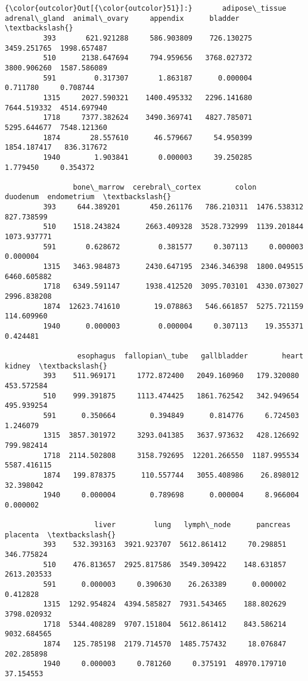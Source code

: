 \documentclass[11pt]{article}
\begin{document}
\begin{Verbatim}[commandchars=\\\{\}]
{\color{outcolor}Out[{\color{outcolor}51}]:}       adipose\_tissue  adrenal\_gland  animal\_ovary     appendix      bladder  \textbackslash{}
         393       621.921288     586.903809    726.130275  3459.251765  1998.657487   
         510      2138.647694     794.959656   3768.027372  3800.906260  1587.586089   
         591         0.317307       1.863187      0.000004     0.711780     0.708744   
         1315     2027.590321    1400.495332   2296.141680  7644.519332  4514.697940   
         1718     7377.382624    3490.369741   4827.785071  5295.644677  7548.121360   
         1874       28.557610      46.579667     54.950399  1854.187417   836.317672   
         1940        1.903841       0.000003     39.250285     1.779450     0.354372   
         
                bone\_marrow  cerebral\_cortex        colon     duodenum  endometrium  \textbackslash{}
         393     644.389201       450.261176   786.210311  1476.538312   827.738599   
         510    1518.243824      2663.409328  3528.732999  1139.201844  1073.937771   
         591       0.628672         0.381577     0.307113     0.000003     0.000004   
         1315   3463.984873      2430.647195  2346.346398  1800.049515  6460.605882   
         1718   6349.591147      1938.412520  3095.703101  4330.073027  2996.838208   
         1874  12623.741610        19.078863   546.661857  5275.721159   114.609960   
         1940      0.000003         0.000004     0.307113    19.355371     0.424481   
         
                 esophagus  fallopian\_tube   gallbladder        heart       kidney  \textbackslash{}
         393    511.969171     1772.872400   2049.160960   179.320080   453.572584   
         510    999.391875     1113.474425   1861.762542   342.949654   495.939254   
         591      0.350664        0.394849      0.814776     6.724503     1.246079   
         1315  3857.301972     3293.041385   3637.973632   428.126692   799.982414   
         1718  2114.502808     3158.792695  12201.266550  1187.995534  5587.416115   
         1874   199.878375      110.557744   3055.408986    26.898012    32.398042   
         1940     0.000004        0.789698      0.000004     8.966004     0.000002   
         
                     liver         lung   lymph\_node      pancreas     placenta  \textbackslash{}
         393    532.393163  3921.923707  5612.861412     70.298851   346.775824   
         510    476.813657  2925.817586  3549.309422    148.631857  2613.203533   
         591      0.000003     0.390630    26.263389      0.000002     0.412828   
         1315  1292.954824  4394.585827  7931.543465    188.802629  3798.020932   
         1718  5344.408289  9707.151804  5612.861412    843.586214  9032.684565   
         1874   125.785198  2179.714570  1485.757432     18.076847   202.285898   
         1940     0.000003     0.781260     0.375191  48970.179710    37.154553   
         

\end{Verbatim}
\end{document}

